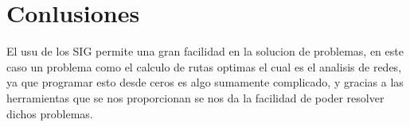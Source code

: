 \chapter{Conlusiones}

El usu de los SIG permite una gran facilidad en la solucion de problemas, en este caso un problema como el calculo de rutas optimas el cual es el analisis de redes, ya que programar esto desde ceros es algo sumamente complicado, y gracias a las herramientas que se nos proporcionan se nos da la facilidad de poder resolver dichos problemas. 
